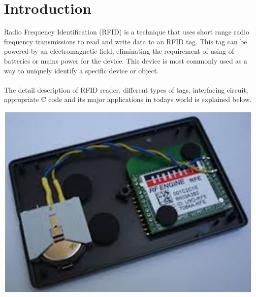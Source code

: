 \documentclass[a4paper,29.6pt]{article}
\begin{document}
\section{Introduction}

\begin{large}
\hspace{.5in}Radio Frequency Identification (RFID) is a technique that uses short range radio frequency transmissions to read and write data to an RFID tag. This tag can be powered by an electromagnetic field, eliminating the requirement of using of batteries or mains power for the device. This device is most commonly used as a way to uniquely identify a specific device or object.
\\\\
The detail description of RFID reader, different types of tags, interfacing circuit, appropriate C code and its major applications in todays world is explained below.\\

\end{large}
\begin{center}
\includegraphics[scale=0.5]{first}
\end{center}


\newpage
\end{document}

